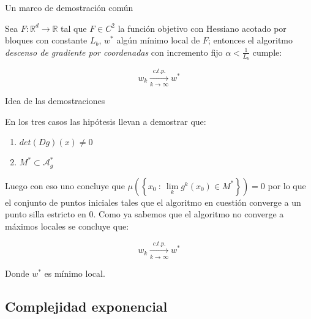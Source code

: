 \documentclass{beamer}
\newcommand{\puntosfijos}{\mathcal{A}_{g}^{*}}
\newcommand{\R}{{\mathbb{R}}}
\newcommand{\sett}[1]{\left\lbrace#1\right\rbrace}
\newcommand{\Biglim}[2]{\lim\limits_{#1}{#2}}
\begin{document}
\begin{frame}{Un marco de demostraci\'on com\'un}

\begin{theorem}
	Sea $F: \R^d \rightarrow \R$ tal que $F \in C^2$  la funci\'on objetivo con Hessiano acotado por bloques con constante $L_b$, $w^*$ alg\'un m\'inimo local de $F$; entonces el algoritmo \textit{descenso de gradiente por coordenadas} con incremento fijo $\alpha < \frac{1}{L_b}$ cumple:
	
	\begin{equation*}
	w_k \xrightarrow[k \rightarrow \infty]{c.t.p.} w^*
	\end{equation*}
	
\end{theorem}
\end{frame}

\begin{frame}{Idea de las demostraciones}

En los tres casos las hip\'otesis llevan a demostrar que:

\begin{enumerate}
	\item 	$det\left(Dg\right)(x) \neq 0$
	\item $M^* \subset \puntosfijos$
\end{enumerate}

Luego con eso uno concluye que $\mu\left(\sett{x_0 \ \colon \ \Biglim{k}{g^k(x_0) \in M^*}}\right) =0$ por lo que el conjunto de puntos iniciales tales que el algoritmo en cuesti\'on converge a un punto silla estricto en $0$. Como ya sabemos que el algoritmo no converge a m\'aximos locales se concluye que:

	\begin{equation*}
w_k \xrightarrow[k \rightarrow \infty]{c.t.p.} w^*
\end{equation*}

Donde $w^*$ es m\'inimo local.

\end{frame}

\subsection{Complejidad exponencial}
\end{document}
